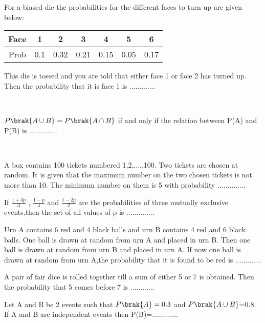 
\iffalse
  \title{PROBABILITY}
  \author{J.KEDARANANDA}
  \section{fitb}
\fi
    \item For a biased die the probabilities for the different faces to turn up are given below:
    \begin{center}
    \begin{tabular}{|c|c|c|c|c|c|c|}
       \hline
       Face & 1 & 2 & 3 & 4 & 5 & 6 \\
       \hline
       Prob & 0.1 & 0.32 & 0.21 & 0.15 & 0.05 & 0.17\\
       \hline 
    \end{tabular}
\end{center}\bigskip
    This die is tossed and you are told that either face 1 or face 2 has turned up. Then the probability that it is face 1 is .............
    
    \hfill{}\\
    
    \item $P\brak{A \cup B}=P\brak{A \cap B }$ if and only if the relation between P(A) and P(B) is .............. 
    
    \hfill{}\\
    \item A box contains 100 tickets numbered 1,2,....,100. Two tickets are chosen at random. It is given that the maximum number on the two chosen tickets is not more than 10. The minimum number on them is 5 with probability ..............\hfill{}\\
    \item If $\frac{1+3p}{3}$ , $\frac{1-p}{4}$ and $\frac{1-2p}{2}$ are the probabilities of three mutually exclusive events,then the set of all values of p is ..............\hfill{}\\
    \item Urn A contains 6 red and 4 black balls and urn B contains 4 red and 6 black balls. One ball is drawn at random from urn A and placed in urn B. Then one ball is drawn at random from urn B and placed in urn A. If now one ball is drawn at random from urn A,the probability that it is found to be red is .............\hfill{}\\
    \item A pair of fair dice is rolled together till a sum of either 5 or 7 is obtained. Then the probability that 5 comes before 7 is 
    ............
    \hfill{}\\
    \item Let A and B be 2 events such that $P\brak{A}=0.3$ and $P\brak{A \cup B}$=0.8. If A and B are independent events then P(B)=.............\hfill{}\\
    
